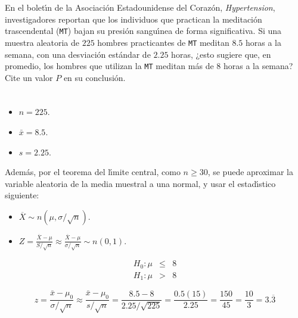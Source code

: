 \begin{enunciado}
 En el bolet\'{\i}n de la Asociaci\'on Estadounidense del Coraz\'on, \textit{Hypertension}, investigadores reportan que los individuos que practican la meditaci\'on trascendental (\texttt{MT}) bajan su presi\'on sangu\'{\i}nea de forma significativa. Si una muestra aleatoria de $225$ hombres practicantes de \texttt{MT} meditan $8.5$ horas a la semana, con una desviaci\'on est\'andar de $2.25$ horas, ¿esto sugiere que, en promedio, los hombres que utilizan la \texttt{MT} meditan m\'as de $8$ horas a la semana? Cite un valor $P$ en su conclusi\'on.
\end{enunciado}

\begin{solucion}
 \begin{datos}
  $\phantom{0}$
  \begin{itemize}
   \item $n = 225$.
   \item $\bar{x} = 8.5$.
   \item $s = 2.25$.
  \end{itemize}
  Adem\'as, por el teorema del l\'{\i}mite central, como $n \geq 30$, se puede aproximar la variable aleatoria de la media muestral a una normal, y usar el estad\'{\i}stico siguiente:
  \begin{itemize}
   \item $\overline{X} \sim n\left( \mu , \sigma/\sqrt{n} \right)$.
   \item $Z = \frac{\overline{X}-\mu}{S/\sqrt{n}} \approx
   \frac{\overline{X} - \mu}{\sigma/\sqrt{n}} \sim n(0,1)$.
  \end{itemize}
 \end{datos}

 \begin{hipotesis}
  \begin{eqnarray*}
   H_0: \mu & \leq & 8 \\
   H_1: \mu & > & 8
  \end{eqnarray*}
 \end{hipotesis}

 \begin{estadistico}
  \begin{equation*}
   z = \frac{\bar{x} - \mu_0}{\sigma/\sqrt{n}} \approx \frac{\bar{x} - \mu_0}{s/\sqrt{n}} = \frac{8.5-8}{2.25/\sqrt{225}} = \frac{0.5(15)}{2.25} = \frac{150}{45} = \frac{10}{3} = 3.\overline{3}
  \end{equation*}
 \end{estadistico}


\end{solucion}
